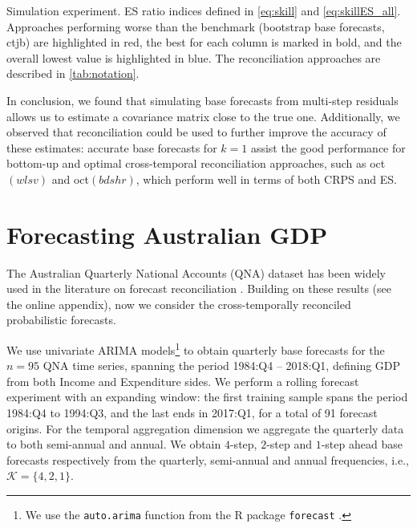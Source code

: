 \documentclass[12pt]{article}
\theoremstyle{definition}
\begin{document}
\begin{table}[!t]
	\centering
	\begingroup
	\fontsize{9}{11}\selectfont
	
	\endgroup
	\caption{Simulation experiment. ES ratio indices defined in \eqref{eq:skill} and \eqref{eq:skillES_all}. Approaches performing worse than the benchmark (bootstrap base forecasts, ctjb) are highlighted in red, the best for each column is marked in bold, and the overall lowest value is highlighted in blue. The reconciliation approaches are described in \autoref{tab:notation}.}
	\label{tab:ar2es}
\end{table}

In conclusion, we found that simulating base forecasts from multi-step residuals allows us to estimate a covariance matrix close to the true one. Additionally, we observed that reconciliation could be used to further improve the accuracy of these estimates: accurate base forecasts for $k=1$ assist the good performance for bottom-up and optimal cross-temporal reconciliation approaches, such as oct$(wlsv)$ and oct$(bdshr)$, which perform well in terms of both CRPS and ES.

\section{Forecasting Australian GDP}\label{sec:ausgdp}

The Australian Quarterly National Accounts (QNA) dataset has been widely used in the literature on forecast reconciliation \citep{athanasopoulos2020, bisaglia2020, difonzo2022c, giro2022, difonzo2023}. Building on these results (see the online appendix), now we consider the cross-temporally reconciled probabilistic forecasts.

We use univariate ARIMA models\footnote{We use the \texttt{auto.arima} function from the R package \texttt{forecast} \citep{Rforecast}.} to obtain quarterly base forecasts for the $n = 95$ QNA time series, spanning the period 1984:Q4 -- 2018:Q1, defining GDP from both Income and Expenditure sides. We perform a rolling forecast experiment with an expanding window: the first training sample spans the period 1984:Q4 to 1994:Q3, and the last ends in 2017:Q1, for a total of 91 forecast origins. For the temporal aggregation dimension we aggregate the quarterly data to both semi-annual and annual. We obtain $4$-step, $2$-step and $1$-step ahead base forecasts respectively from the quarterly, semi-annual and annual frequencies, i.e., $\mathcal{K} = \{4,2,1\}$.
\end{document}
